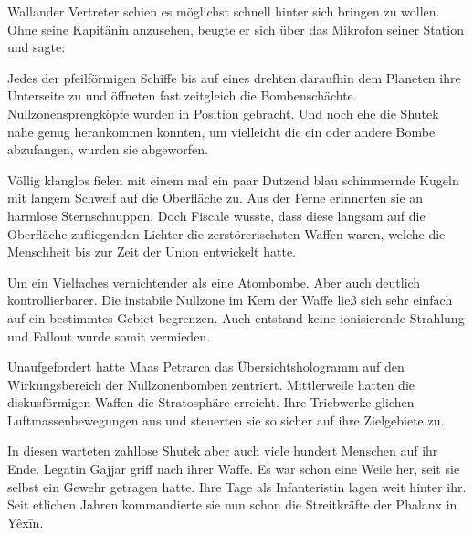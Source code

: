 \par

Wallander Vertreter schien es möglichst schnell hinter sich bringen zu wollen. Ohne seine Kapitänin anzusehen, beugte er sich über das Mikrofon seiner Station und sagte: 

\par

Jedes der pfeilförmigen Schiffe bis auf eines drehten daraufhin dem Planeten ihre Unterseite zu und öffneten fast zeitgleich die Bombenschächte. Nullzonensprengköpfe wurden in Position gebracht. Und noch ehe die Shutek nahe genug herankommen konnten, um vielleicht die ein oder andere Bombe abzufangen, wurden sie abgeworfen.

\par

Völlig klanglos fielen mit einem mal ein paar Dutzend blau schimmernde Kugeln mit langem Schweif auf die Oberfläche zu. Aus der Ferne erinnerten sie an harmlose Sternschnuppen. Doch Fiscale wusste, dass diese langsam auf die Oberfläche zufliegenden Lichter die zerstörerischsten Waffen waren, welche die Menschheit bis zur Zeit der Union entwickelt hatte.

\par

Um ein Vielfaches vernichtender als eine Atombombe. Aber auch deutlich kontrollierbarer. Die instabile Nullzone im Kern der Waffe ließ sich sehr einfach auf ein bestimmtes Gebiet begrenzen. Auch entstand keine ionisierende Strahlung und Fallout wurde somit vermieden.

\par

Unaufgefordert hatte Maas Petrarca das Übersichtshologramm auf den Wirkungsbereich der Nullzonenbomben zentriert. Mittlerweile hatten die diskusförmigen Waffen die Stratosphäre erreicht. Ihre Triebwerke glichen Luftmassenbewegungen aus und steuerten sie so sicher auf ihre Zielgebiete zu.

\par

In diesen warteten zahllose Shutek aber auch viele hundert Menschen auf ihr Ende.
\ortswechsel
Legatin Gajjar griff nach ihrer Waffe. Es war schon eine Weile her, seit sie selbst ein Gewehr getragen hatte. Ihre Tage als Infanteristin lagen weit hinter ihr. Seit etlichen Jahren kommandierte sie nun schon die Streitkräfte der Phalanx in Yêxīn.

